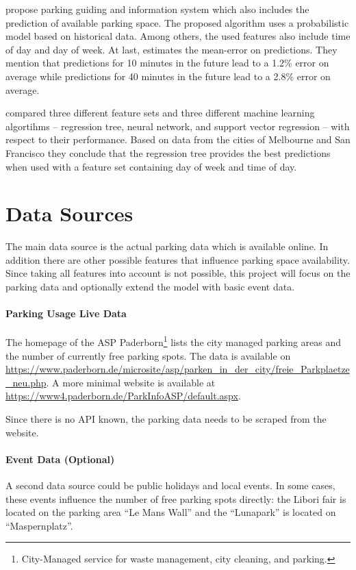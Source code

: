 \documentclass[journal,10pt]{IEEEtran}
\begin{document}
\cite{Rajabioun2013} propose parking guiding and
information system which also includes the prediction of available parking space. The proposed algorithm uses a probabilistic model based on historical data. Among others, the used features also include time of day and day of week. At last, \cite{Rajabioun2013} estimates the mean-error on predictions. They mention that predictions for 10 minutes in the future lead to a 1.2\% error on average while predictions for 40 minutes in the future lead to a 2.8\% error on average.

\cite{Zheng2015} compared three different feature sets and three different machine learning algortihms -- regression tree, neural network, and support vector regression -- with respect to their performance. Based on data from the cities of Melbourne and San Francisco they conclude that the regression tree provides the best predictions when used with a feature set containing day of week and time of day.  


\section{Data Sources}\label{data sources}
The main data source is the actual parking data which is available online. In addition there are other possible features that influence parking space availability. Since taking all features into account is not possible, this project will focus on the parking data and optionally extend the model with basic event data.

\paragraph{Parking Usage Live Data}
The homepage of the ASP Paderborn\footnote{City-Managed service for waste management, city cleaning, and parking.} lists the city managed parking areas and the number of currently free parking spots. 
The data is available on \url{https://www.paderborn.de/microsite/asp/parken_in_der_city/freie_Parkplaetze_neu.php}. A more minimal website is available at \url{https://www4.paderborn.de/ParkInfoASP/default.aspx}. 

Since there is no API known, the parking data needs to be scraped from the website.  


\paragraph{Event Data (Optional)}
A second data source could be public holidays and local events. In some cases, these events influence the number of free parking spots directly: the Libori fair is located on the parking area ``Le Mans Wall'' and the ``Lunapark'' is located on ``Maspernplatz''. 
\end{document}
